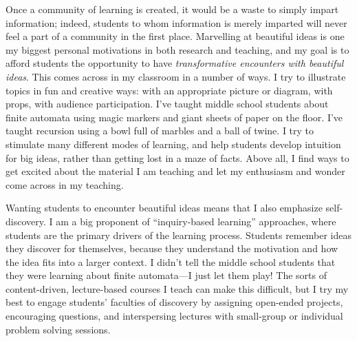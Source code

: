 \documentclass{article}
\begin{document}
Once a community of learning is created, it would be a waste to simply
impart information; indeed, students to whom information is merely
imparted will never feel a part of a community in the first
place. Marvelling at beautiful ideas is one my biggest personal
motivations in both research and teaching, and my goal is to afford
students the opportunity to have \emph{transformative encounters with
  beautiful ideas}.  This comes across in my classroom in a number of
ways.  I try to illustrate topics in fun and creative ways: with an
appropriate picture or diagram, with props, with audience
participation.  I've taught middle school students about finite
automata using magic markers and giant sheets of paper on the floor.
I've taught recursion using a bowl full of marbles and a ball of
twine.  I try to stimulate many different modes of learning, and help
students develop intuition for big ideas, rather than getting lost in
a maze of facts.  Above all, I find ways to get excited about the
material I am teaching and let my enthusiasm and wonder come across in
my teaching.

Wanting students to encounter beautiful ideas means that I also
emphasize self-discovery. I am a big proponent of ``inquiry-based
learning'' approaches, where students are the primary drivers of the
learning process. Students remember ideas they discover for
themselves, because they understand the motivation and how the idea
fits into a larger context. I didn't tell the middle school students
that they were learning about finite automata---I just let them play!
The sorts of content-driven, lecture-based courses I teach can make
this difficult, but I try my best to engage students' faculties of
discovery by assigning open-ended projects, encouraging questions, and
interspersing lectures with small-group or individual problem solving
sessions.


\end{document}
